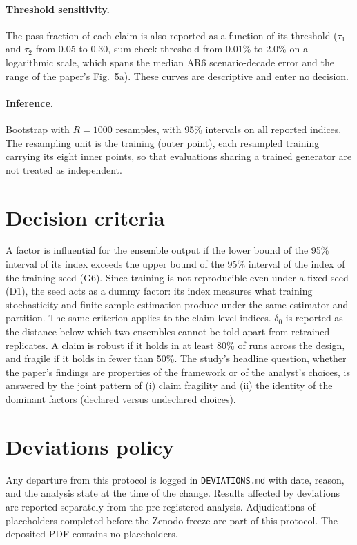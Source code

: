 \documentclass[11pt,a4paper]{article}
\newcommand{\prop}[1]{#1}
\newcommand{\prop}[1]{\textcolor{blue}{#1}}
\begin{document}
\paragraph{Threshold sensitivity.} \prop{The pass fraction of each claim is
also reported as a function of its threshold ($\tau_1$ and $\tau_2$ from
0.05 to 0.30, sum-check threshold from 0.01\% to 2.0\% on a logarithmic
scale, which spans the median AR6 scenario-decade error and the range of
the paper's Fig.~5a). These curves are
descriptive and enter no decision.}

\paragraph{Inference.} Bootstrap with $R=1000$ resamples, with 95\%
intervals on all reported indices. \prop{The resampling unit is the
training (outer point), each resampled training carrying its eight inner
points, so that evaluations sharing a trained generator are not treated as
independent.}

\section{Decision criteria}\label{sec:criteria}
\prop{A factor is influential for the ensemble output if the lower bound of
the 95\% interval of its index exceeds the upper bound of the 95\% interval
of the index of the training seed (G6). Since training is not reproducible
even under a fixed seed (D1), the seed acts as a dummy factor: its index
measures what training stochasticity and finite-sample estimation produce
under the same estimator and partition. The same criterion applies to the
claim-level indices. $\delta_0$ is reported as the distance below which two
ensembles cannot be told apart from retrained replicates.} A claim is
robust if it holds in at least 80\% of runs across the design, and fragile
if it holds in fewer than 50\%. The study's headline question, whether the
paper's findings are properties of the framework or of the analyst's
choices, is answered by the joint pattern of (i) claim fragility and (ii)
the identity of the dominant factors (declared versus undeclared choices).

\section{Deviations policy}\label{sec:deviations}
Any departure from this protocol is logged in \texttt{DEVIATIONS.md} with
date, reason, and the analysis state at the time of the change. Results
affected by deviations are reported separately from the pre-registered
analysis. Adjudications of placeholders completed before the Zenodo freeze
are part of this protocol. The deposited PDF contains no placeholders.
\end{document}
